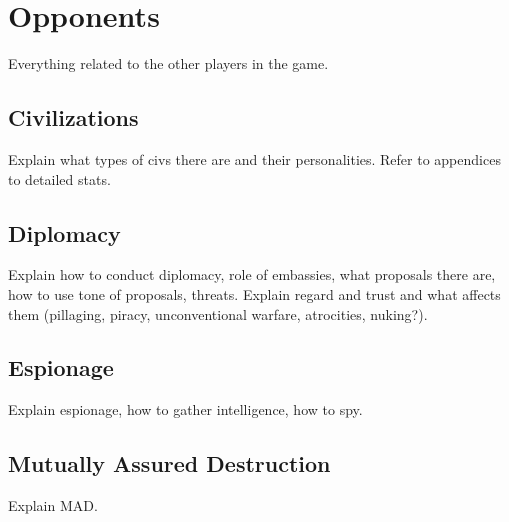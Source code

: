 \chapter{Opponents}
Everything related to the other players in the game.

\section{Civilizations}
Explain what types of civs there are and their personalities. Refer to
appendices to detailed stats.

\section{Diplomacy}
Explain how to conduct diplomacy, role of embassies, what proposals there are,
how to use tone of proposals, threats. Explain regard and trust and what
affects them (pillaging, piracy, unconventional warfare, atrocities, nuking?).

\section{Espionage}
Explain espionage, how to gather intelligence, how to spy.

\section{Mutually Assured Destruction}
Explain MAD.

